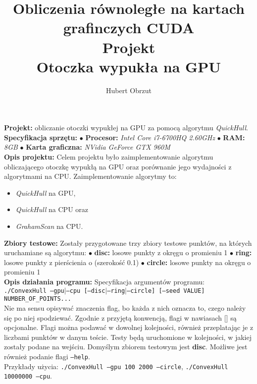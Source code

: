 \documentclass[11pt]{article}
\title{
    Obliczenia równoległe na kartach grafinczych CUDA \\
    Projekt \\
    Otoczka wypukła na GPU \\
}
\author{Hubert Obrzut}
\date{}
\begin{document}
	\maketitle
	
	\textbf{Projekt:} obliczanie otoczki wypukłej na GPU za pomocą algorytmu \textit{QuickHull}. \\		
	
	\textbf{Specyfikacja sprzętu:} $\bullet$ \textbf{Procesor:} \textit{Intel Core i7-6700HQ 2.60GHz} $\bullet$ \textbf{RAM:} \textit{8GB} $\bullet$ \textbf{Karta graficzna:} \textit{NVidia GeForce GTX 960M} \\
	
	\textbf{Opis projektu:} Celem projektu było zaimplementowanie algorytmu obliczającego otoczkę wypukłą na GPU oraz porównanie jego wydajności z algorytmami na CPU. Zaimplementowanie algorytmy to:
	\begin{itemize}
	    \item \textit{QuickHull} na GPU,
	    \item \textit{QuickHull} na CPU oraz
	    \item \textit{GrahamScan} na CPU.
    \end{itemize}
    
    \textbf{Zbiory testowe:} Zostały przygotowane trzy zbiory testowe punktów, na których uruchamiane są algorytmu: $\bullet$ \textbf{disc:} losowe punkty z okręgu o promieniu 1 $\bullet$ \textbf{ring:} losowe punkty z pierścienia o (szerokość 0.1) $\bullet$ \textbf{circle:} losowe punkty na okręgu o promieniu 1 \\
    
    \textbf{Opis działania programu:} Specyfikacja argumentów programu: \\
    
    \texttt{./ConvexHull --gpu$\mid$--cpu [--disc$\mid$--ring$\mid$--circle] [--seed VALUE] NUMBER\_OF\_POINTS...} \\
    
    Nie ma sensu opisywać znaczenia flag, bo każda z nich oznacza to, czego należy się po niej spodziewać. Zgodnie z przyjętą konwencją, flagi w nawiasach [] są opcjonalne. Flagi można podawać w dowolnej kolejności, również przeplatając je z liczbami punktów w danym teście. Testy będą uruchomione w kolejności, w jakiej zostały podane na wejściu. Domyślym zbiorem testowym jest \textbf{disc}. Możliwe jest również podanie flagi \texttt{--help}. \\
    
    Przykłady użycia: \texttt{./ConvexHull --gpu 100 2000 --circle}, \texttt{./ConvexHull 10000000 --cpu}. \\
    
\end{document}
